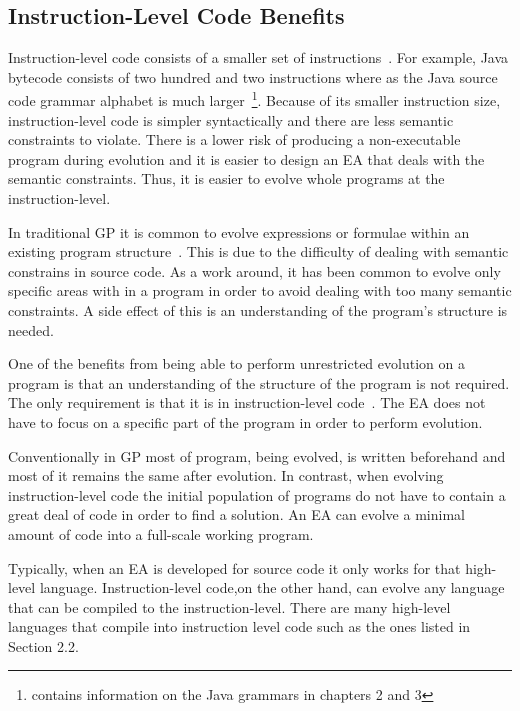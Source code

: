 \documentclass{sig-alternate}
\begin{document}
\subsection{Instruction-Level Code Benefits}

Instruction-level code consists of a smaller set of instructions~\cite{Assembly:2010}. For example, Java bytecode consists of two hundred and two instructions where as the Java source code grammar alphabet is much larger~\cite{JVMspec:2013, Oracle:2013}\footnote{\cite{Oracle:2013} contains information on the Java grammars in chapters 2 and 3}. Because of its smaller instruction size, instruction-level code is simpler syntactically and there are less semantic constraints to violate. There is a lower risk of producing a non-executable program during evolution and it is easier to design an EA that deals with the semantic constraints. Thus, it is easier to evolve whole programs at the instruction-level.\par

In traditional GP it is common to evolve expressions or formulae within an existing program structure~\cite{FINCH:2011}. This is due to the difficulty of dealing with semantic constrains in source code. As a work around, it has been common to evolve only specific areas with in a program in order to avoid dealing with too many semantic constraints. A side effect of this is an understanding of the program's structure is needed.\par

One of the benefits from being able to perform unrestricted evolution on a program is that an understanding of the structure of the program is not required. The only requirement is that it is in instruction-level code~\cite{FINCH2:2009, Assembly:2010}. The EA does not have to focus on a specific part of the program in order to perform evolution. \par

Conventionally in GP most of program, being evolved, is written beforehand and most of it remains the same after evolution. In contrast, when evolving instruction-level code the initial population of programs do not have to contain a great deal of code in order to find a solution. An EA can evolve a minimal amount of code into a full-scale working program.

Typically, when an EA is developed for source code it only works for that high-level language. Instruction-level code,on the other hand, can evolve any language that can be compiled to the instruction-level. There are many high-level languages that compile into instruction level code such as the ones listed in Section 2.2.  
\end{document}
